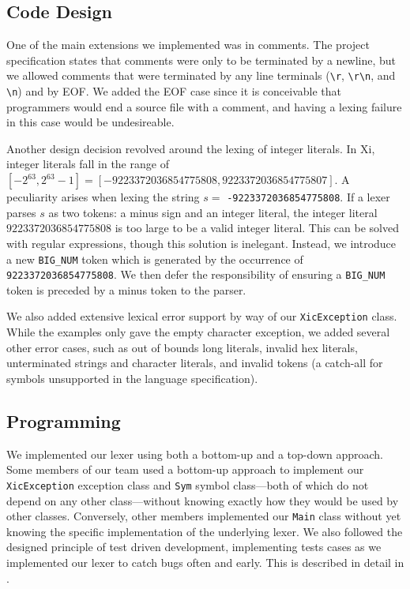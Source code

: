 \documentclass{hw}
\begin{document}
\subsection{Code Design}
One of the main extensions we implemented was in comments. The project
specification states that comments were only to be terminated by a newline, but
we allowed comments that were terminated by any line terminals (\verb$\r$,
\verb$\r\n$, and \verb$\n$) and by EOF.  We added the EOF case since it is
conceivable that programmers would end a source file with a comment, and having
a lexing failure in this case would be undesireable.

\newcommand{\minint}{9223372036854775808}
\newcommand{\maxint}{9223372036854775807}
Another design decision revolved around the lexing of integer literals. In Xi,
integer literals fall in the range of $[-2^{63}, 2^{63}-1] = [-\minint,
\maxint]$. A peculiarity arises when lexing the string $s = $
\texttt{-\minint}. If a lexer parses $s$ as two tokens: a minus sign and an
integer literal, the integer literal $\minint$ is too large to be a valid
integer literal. This can be solved with regular expressions, though this
solution is inelegant. Instead, we introduce a new \texttt{BIG\_NUM} token
which is generated by the occurrence of \texttt{\minint}. We then defer the
responsibility of ensuring a \texttt{BIG\_NUM} token is preceded by a minus
token to the parser.

We also added extensive lexical error support by way of our
\texttt{XicException} class. While the examples only gave the empty character
exception, we added several other error cases, such as out of bounds long
literals, invalid hex literals, unterminated strings and character literals,
and invalid tokens (a catch-all for symbols unsupported in the language
specification).

\subsection{Programming}
We implemented our lexer using both a bottom-up and a top-down approach. Some
members of our team used a bottom-up approach to implement our
\texttt{XicException} exception class and \texttt{Sym} symbol class---both
of which do not depend on any other class---without knowing exactly how they
would be used by other classes. Conversely, other members implemented our
\texttt{Main} class without yet knowing the specific implementation of the
underlying lexer. We also followed the designed principle of test driven
development, implementing tests cases as we implemented our lexer to catch bugs
often and early. This is described in detail in .
\end{document}

